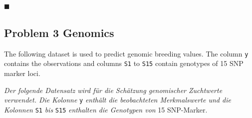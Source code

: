 \documentclass[
]{article}
\newcommand{\solend}
{\vspace{2ex}$\blacksquare$}
\begin{document}
\solend

\clearpage
\pagebreak

\hypertarget{problem-3-genomics}{%
\subsection{Problem 3 Genomics}\label{problem-3-genomics}}

The following dataset is used to predict genomic breeding values. The
column \texttt{y} contains the observations and columns \texttt{S1} to
\texttt{S15} contain genotypes of 15 SNP marker loci.

\textit{Der folgende Datensatz wird für die Schätzung genomischer Zuchtwerte verwendet. Die Kolonne }
\verb+y+
\textit{ enthält die beobachteten Merkmalswerte und die Kolonnen }
\verb+S1+ \textit{ bis } \verb+S15+
\textit{ enthalten die Genotypen von } 15 SNP-Marker.
\end{document}

